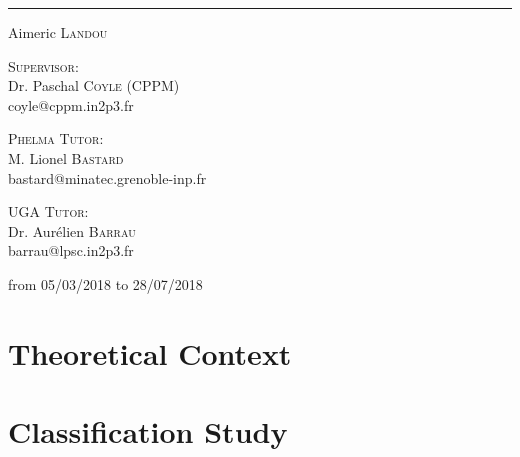 \documentclass[11pt]{report}
\begin{document}
\begin{center}
    \rule{\linewidth}{1pt}\par
    \vspace{10pt}
    {\Large Aimeric \textsc{Landou}\par}
    \vspace{12pt}
    {\Large \textsc{Supervisor:} \\[4pt] \large Dr. Paschal \textsc{Coyle}  (CPPM)\\coyle@cppm.in2p3.fr \par}
    \vspace{8pt}
    {\Large \textsc{Phelma Tutor:} \\[4pt] \large M. Lionel \textsc{Bastard} \\bastard@minatec.grenoble-inp.fr\par}
    \vspace{8pt}
    {\Large \textsc{UGA Tutor:} \\[4pt] \large Dr. Aurélien \textsc{Barrau}\\barrau@lpsc.in2p3.fr\par}
    \vspace{18pt}
\end{center}
\begin{center}
\vspace{20pt}
    {\large from 05/03/2018 to 28/07/2018}
\end{center}



\tableofcontents



\listoffigures



\chapter{Theoretical Context}\label{Theoretical_Context}

\chapter{Classification Study} \label{Classification_Study}



\nocite{*}
 



\thispagestyle{empty}
\end{document}
